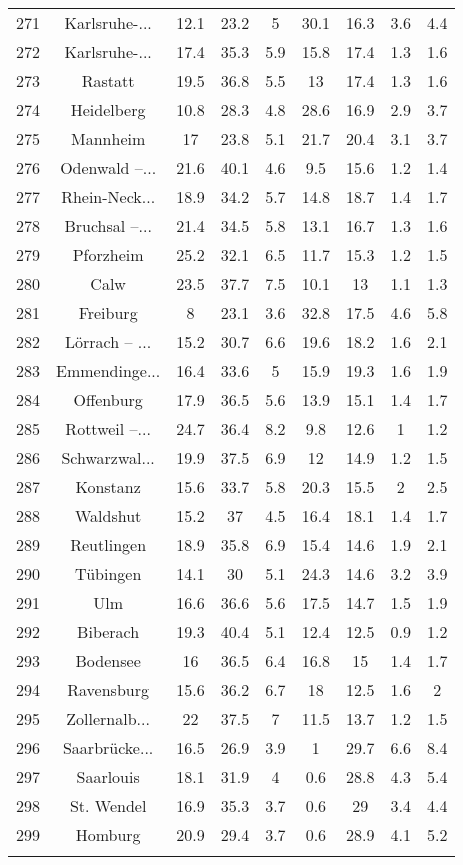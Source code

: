 \begin{table}[!htbp]
\begin{tabular}{@{\extracolsep{5pt}} ccccccccc}
271 & Karlsruhe-... & 12.1 & 23.2 & 5 & 30.1 & 16.3 & 3.6 & 4.4 \\ 
272 & Karlsruhe-... & 17.4 & 35.3 & 5.9 & 15.8 & 17.4 & 1.3 & 1.6 \\ 
273 & Rastatt & 19.5 & 36.8 & 5.5 & 13 & 17.4 & 1.3 & 1.6 \\ 
274 & Heidelberg & 10.8 & 28.3 & 4.8 & 28.6 & 16.9 & 2.9 & 3.7 \\ 
275 & Mannheim & 17 & 23.8 & 5.1 & 21.7 & 20.4 & 3.1 & 3.7 \\ 
276 & Odenwald –... & 21.6 & 40.1 & 4.6 & 9.5 & 15.6 & 1.2 & 1.4 \\ 
277 & Rhein-Neck... & 18.9 & 34.2 & 5.7 & 14.8 & 18.7 & 1.4 & 1.7 \\ 
278 & Bruchsal –... & 21.4 & 34.5 & 5.8 & 13.1 & 16.7 & 1.3 & 1.6 \\ 
279 & Pforzheim & 25.2 & 32.1 & 6.5 & 11.7 & 15.3 & 1.2 & 1.5 \\ 
280 & Calw & 23.5 & 37.7 & 7.5 & 10.1 & 13 & 1.1 & 1.3 \\ 
281 & Freiburg & 8 & 23.1 & 3.6 & 32.8 & 17.5 & 4.6 & 5.8 \\ 
282 & Lörrach – ... & 15.2 & 30.7 & 6.6 & 19.6 & 18.2 & 1.6 & 2.1 \\ 
283 & Emmendinge... & 16.4 & 33.6 & 5 & 15.9 & 19.3 & 1.6 & 1.9 \\ 
284 & Offenburg & 17.9 & 36.5 & 5.6 & 13.9 & 15.1 & 1.4 & 1.7 \\ 
285 & Rottweil –... & 24.7 & 36.4 & 8.2 & 9.8 & 12.6 & 1 & 1.2 \\ 
286 & Schwarzwal... & 19.9 & 37.5 & 6.9 & 12 & 14.9 & 1.2 & 1.5 \\ 
287 & Konstanz & 15.6 & 33.7 & 5.8 & 20.3 & 15.5 & 2 & 2.5 \\ 
288 & Waldshut & 15.2 & 37 & 4.5 & 16.4 & 18.1 & 1.4 & 1.7 \\ 
289 & Reutlingen & 18.9 & 35.8 & 6.9 & 15.4 & 14.6 & 1.9 & 2.1 \\ 
290 & Tübingen & 14.1 & 30 & 5.1 & 24.3 & 14.6 & 3.2 & 3.9 \\ 
291 & Ulm & 16.6 & 36.6 & 5.6 & 17.5 & 14.7 & 1.5 & 1.9 \\ 
292 & Biberach & 19.3 & 40.4 & 5.1 & 12.4 & 12.5 & 0.9 & 1.2 \\ 
293 & Bodensee & 16 & 36.5 & 6.4 & 16.8 & 15 & 1.4 & 1.7 \\ 
294 & Ravensburg & 15.6 & 36.2 & 6.7 & 18 & 12.5 & 1.6 & 2 \\ 
295 & Zollernalb... & 22 & 37.5 & 7 & 11.5 & 13.7 & 1.2 & 1.5 \\ 
296 & Saarbrücke... & 16.5 & 26.9 & 3.9 & 1 & 29.7 & 6.6 & 8.4 \\ 
297 & Saarlouis & 18.1 & 31.9 & 4 & 0.6 & 28.8 & 4.3 & 5.4 \\ 
298 & St. Wendel & 16.9 & 35.3 & 3.7 & 0.6 & 29 & 3.4 & 4.4 \\ 
299 & Homburg & 20.9 & 29.4 & 3.7 & 0.6 & 28.9 & 4.1 & 5.2 \\ 
\hline \\[-1.8ex] 
\end{tabular} 
\end{table} 
